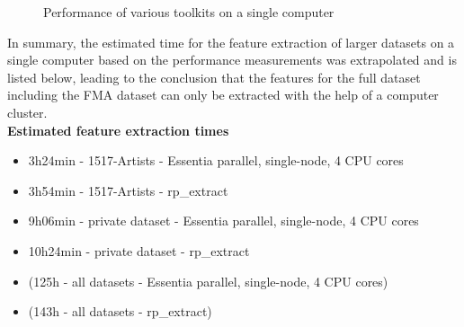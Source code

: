 \begin{figure}[htbp]
	\centering
	\caption{Performance of various toolkits on a single computer}
	\label{perfex}
\end{figure}
\noindent In summary, the estimated time for the feature extraction of larger datasets on a single computer based on the performance measurements was extrapolated and is listed below, leading to the conclusion that the features for the full dataset including the FMA dataset can only be extracted with the help of a computer cluster.
\ \\
\textbf{Estimated feature extraction times}
\begin{itemize}
	\setlength\itemsep{-0.5em}
	\item 3h24min - 1517-Artists - Essentia parallel, single-node, 4 CPU cores
	\item 3h54min - 1517-Artists - rp\_extract
	\item 9h06min - private dataset - Essentia parallel, single-node, 4 CPU cores
	\item 10h24min - private dataset - rp\_extract
	\item (125h - all datasets - Essentia parallel, single-node, 4 CPU cores)
	\item (143h - all datasets - rp\_extract)
\end{itemize}

